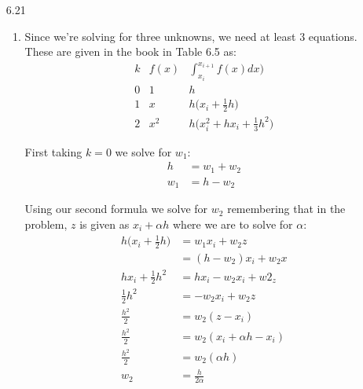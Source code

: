 \documentclass[11pt,a4paper]{article}
\begin{document}
\begin{itemize}
\begin{enumerate} [label={\alph*)}]
				\end{enumerate}
				
			\item[6.21]
				\begin{enumerate} [label={\alph*)}]
					\item Since we're solving for three unknowns, we need at least 3 equations. These are given in the book in Table 6.5 as:
					$$\begin{array}{|c|c|c|}
						k & f(x) & \displaystyle\int_{x_i}^{x_{i+1}} f(x)dx) \\ \hline
						0 & 1 & h \\
						1 & x & h\Big(x_i + \frac{1}{2}h\Big) \\
						2 & x^2 & h\Big(x_i^2 + hx_i + \frac{1}{3}h^2 \Big)
					\end{array}$$
					
					First taking $k=0$ we solve for $w_1$:
					\begin{align*}
						h &= w_1 + w_2 \\
						w_1 &= h - w_2
					\end{align*}
					
					Using our second formula we solve for $w_2$ remembering that in the problem, $z$ is given as $x_i + \alpha h$ where we are to solve for $\alpha$:
					\begin{align*}
						h\Big(x_i + \frac{1}{2}h\Big) &= w_1x_i + w_2z \\
						&= (h-w_2)x_i + w_2x \\
						hx_i + \frac{1}{2}h^2 &= hx_i-w_2x_i+w2_z \\
						\frac{1}{2}h^2 &= -w_2x_i+w_2z \\
						\frac{h^2}{2} &= w_2(z - x_i) \\
						\frac{h^2}{2} &= w_2(x_i + \alpha h - x_i) \\
						\frac{h^2}{2} &= w_2(\alpha h) \\
						w_2 &= \frac{h}{2\alpha}
					\end{align*}
					

\end{enumerate}
\end{itemize}
\end{document}
